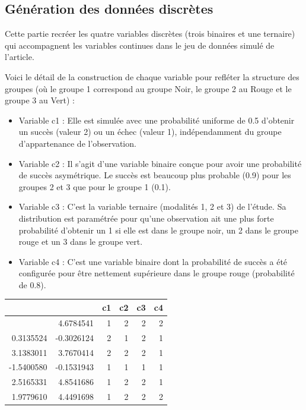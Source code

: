\documentclass{article}
\begin{document}
\subsection{Génération des données
discrètes}\label{guxe9nuxe9ration-des-donnuxe9es-discruxe8tes}

Cette partie recréer les quatre variables discrètes (trois binaires et
une ternaire) qui accompagnent les variables continues dans le jeu de
données simulé de l'article.

Voici le détail de la construction de chaque variable pour refléter la
structure des groupes (où le groupe 1 correspond au groupe Noir, le
groupe 2 au Rouge et le groupe 3 au Vert) :

\begin{itemize}
\item
  Variable c1 : Elle est simulée avec une probabilité uniforme de 0.5
  d'obtenir un succès (valeur 2) ou un échec (valeur 1), indépendamment
  du groupe d'appartenance de l'observation.
\item
  Variable c2 : Il s'agit d'une variable binaire conçue pour avoir une
  probabilité de succès asymétrique. Le succès est beaucoup plus
  probable (0.9) pour les groupes 2 et 3 que pour le groupe 1 (0.1).
\item
  Variable c3 : C'est la variable ternaire (modalités 1, 2 et 3) de
  l'étude. Sa distribution est paramétrée pour qu'une observation ait
  une plus forte probabilité d'obtenir un 1 si elle est dans le groupe
  noir, un 2 dans le groupe rouge et un 3 dans le groupe vert.
\item
  Variable c4 : C'est une variable binaire dont la probabilité de succès
  a été configurée pour être nettement supérieure dans le groupe rouge
  (probabilité de 0.8).
\end{itemize}

{\def\LTcaptype{none} %
\begin{longtable}[]{@{}rrrrrr@{}}
\toprule\noalign{}
& & c1 & c2 & c3 & c4 \\
\midrule\noalign{}
\endhead
\bottomrule\noalign{}
\endlastfoot
1.6137555 & 4.6784541 & 1 & 2 & 2 & 2 \\
0.3135524 & -0.3026124 & 2 & 1 & 2 & 1 \\
3.1383011 & 3.7670414 & 2 & 2 & 2 & 1 \\
-1.5400580 & -0.1531943 & 1 & 1 & 1 & 1 \\
2.5165331 & 4.8541686 & 1 & 2 & 2 & 1 \\
1.9779610 & 4.4491698 & 1 & 2 & 2 & 2 \\
\end{longtable}
}
\end{document}
